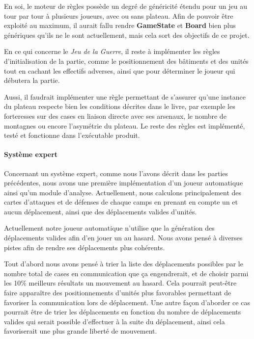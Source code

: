 \documentclass[a4paper]{report}
\begin{document}
En soi, le moteur de règles possède un degré de généricité étendu pour un jeu au tour par tour à plusieurs joueurs, avec ou sans plateau. Afin de pouvoir être exploité au maximum, il aurait fallu rendre \textbf{GameState} et \textbf{Board} bien plus génériques qu'ils ne le sont actuellement, mais cela sort des objectifs de ce projet.

En ce qui concerne le \textit{Jeu de la Guerre}, il reste à implémenter les règles d'initialisation de la partie, comme le positionnement des bâtiments et des unités tout en cachant les effectifs adverses, ainsi que pour déterminer le joueur qui débutera la partie.

Aussi, il faudrait implémenter une règle permettant de s'assurer qu'une instance du plateau respecte bien les conditions décrites dans le livre, par exemple les forteresses sur des cases en liaison directe avec ses arsenaux, le nombre de montagnes ou encore l’asymétrie du plateau. Le reste des règles est implémenté, testé et fonctionne dans l'exécutable produit.

\paragraph*{Système expert}

Concernant un système expert, comme nous l'avons décrit dans les parties précédentes, nous avons une première implémentation d'un joueur automatique ainsi qu'un module d'analyse. Actuellement, nous calculons principalement des cartes d'attaques et de défenses de chaque camps en prenant en compte un et aucun déplacement, ainsi que des déplacements valides d'unités.

Actuellement notre joueur automatique n'utilise que la génération des déplacements valides afin d'en jouer un au hasard. Nous avons pensé à diverses pistes afin de rendre ses déplacements plus cohérents.

Tout d'abord nous avons pensé à trier la liste des déplacements possibles par le nombre total de cases en communication que ça engendrerait, et de choisir parmi les 10\% meilleurs résultats un mouvement au hasard. Cela pourrait peut-être faire apparaître des positionnements d'unités plus favorables permettant de favoriser la communication lors de déplacement. Une autre façon d'aborder ce cas pourrait être de trier les déplacements en fonction du nombre de déplacements valides qui serait possible d'effectuer à la suite du déplacement, ainsi cela favoriserait une plus grande liberté de mouvement.
\end{document}
